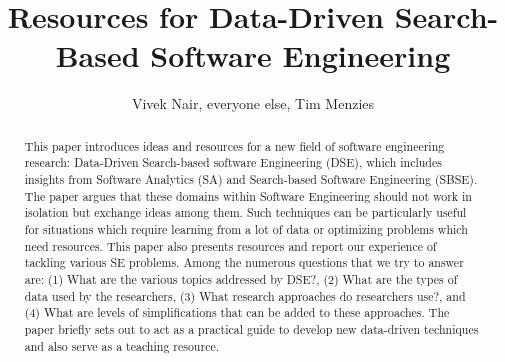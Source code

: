 \documentclass[table, xcdraw, sigconf,review, anonymous]{acmart}
\begin{document}
\title{
Resources for Data-Driven Search-Based Software Engineering}

\author{Vivek Nair, everyone else, Tim Menzies}
\email{}


\begin{abstract}
This paper introduces ideas and resources for a new field of software engineering research: Data-Driven Search-based software Engineering (DSE), which includes insights from Software Analytics (SA) and Search-based Software Engineering (SBSE). The paper argues that these domains within Software Engineering should not work in isolation but exchange ideas among them. Such techniques can be particularly useful for situations which require learning from a lot of data or optimizing problems which need resources. This paper also presents resources and report our experience of tackling various SE problems.  Among the numerous questions that we try to answer are: (1) What are the various topics addressed by DSE?, (2) What are the types of data used by the researchers, (3) What research approaches do researchers use?, and  (4) What are levels of simplifications that can be added to these approaches. The paper briefly sets out to act as a practical guide to develop new data-driven techniques and also serve as a teaching resource.
\end{abstract}

%
%
\end{document}
